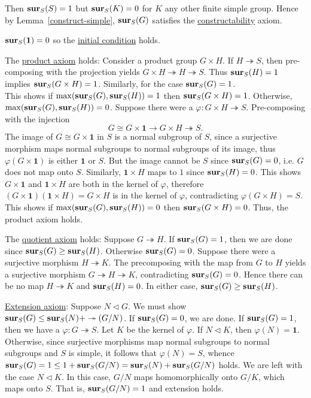\documentclass[a4paper,11pt]{amsart}
\theoremstyle{definition}
\newcommand{\sur}{\twoheadrightarrow}
\newcommand{\1}{{\mathbf 1}}
\newcommand{\surS}{{\bf sur}}
\begin{document}
    
Then $\surS_S(S)=1$ but $\surS_S(K)=0$ for $K$ any other finite simple group. 
Hence by Lemma~\ref{construct-simple}, $\surS_S(G)$ satisfies the \underline{constructability}  axiom.

$\surS_S(\1)=0$ so the \underline{initial condition} holds. 

The \underline{product axiom} holds:   Consider a product group $G\times H$. 
If $H \sur S$, then pre-composing with the projection yields $G \times H \sur H \sur S$.   
Thus $\surS_S(H)=1$ implies $\surS_S(G\times H)=1$.  Similarly, for the case $\surS_S(G)=1$. \\
This shows if $\max(\surS_S(G), \surS_S(H))=1$ then $\surS_S(G\times H)=1$.  
Otherwise,  $\max(\surS_S(G), \surS_S(H))=0$.  Suppose there were a  $\varphi: G\times H \sur S$.  Pre-composing with the injection
$$G\cong G \times \1 \rightarrow G \times H \sur S.$$
The image of $G\cong G\times \1$ in  $S$ is a normal subgroup of $S$, since a surjective morphism maps normal subgroups to normal subgroups of its image, thus $\varphi(G\times \1)$ is either $\1$ or $S$.  But the image cannot be $S$ since $\surS_S(G)=0$, i.e. $G$ does not map onto $S$.  Similarly, $\1\times H$ maps to $1$ since $\surS_S(H)=0$.  This shows $G\times \1$ and $\1 \times H$ are both in the kernel of $\varphi$, therefore $(G\times \1)(\1 \times H) = G\times H$ is in the kernel of $\varphi$, contradicting $\varphi(G\times H)=S$. This shows if $\max(\surS_S(G), \surS_S(H))=0$ then $\surS_S(G\times H)=0$. Thus, the
product axiom holds. 

The \underline{quotient axiom} holds: Suppose $G\sur H$.
If $\surS_S(G)=1$, then we are done since $\surS_S(G)\geq \surS_S(H)$.
Otherwise $\surS_S(G)=0$. Suppose there were a surjective morphism $H\sur K$.
The precomposing with the map from $G$ to $H$ yields a surjective morphism $G\sur H\sur K$, contradicting $\surS_S(G)=0$.
Hence there can be no map $H\sur K$ and $\surS_S(H)=0$.  In either case,
$\surS_S(G)\geq \surS_S(H)$. 

\underline{Extension axiom}: Suppose $N\lhd G$. We must show $\surS_S(G) \leq \surS_S(N)+\sur(G/N)$.
If $\surS_S(G)=0$, we are done. If $\surS_S(G)=1$, then we have a $\varphi: G\sur S$.
Let $K$ be the kernel of $\varphi$.  If $N\lhd K$, then $\varphi(N)=\1$. 
Otherwise, since surjective morphisms map normal subgroups to normal subgroups and $S$ is simple, it follows that $\varphi(N)=S$, 
whence $\surS_S(G) =1  \leq  1 + \surS_S(G/N) = \surS_S(N)+\surS_S(G/N)$ holds. 
We are left with the case $N \lhd K$. 
In this case, $G/N$ maps homomorphically onto $G/K$, which maps onto $S$. 
That is, $\surS_S(G/N)=1$ and extension holds. 
\end{document}
